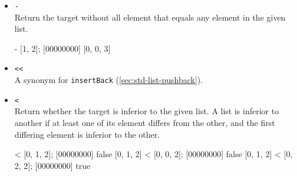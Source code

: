 \begin{itemize}
\item \lstinline|-|\\
Return the target without all element that equals any element in the
given list.

\begin{urbiscript}[firstnumber=last]
[0, 1, 0, 2, 3] - [1, 2];
[00000000] [0, 0, 3]
\end{urbiscript}

\item \lstinline|<<|\\
A synonym for \lstinline|insertBack| (\autoref{sec:std-list-pushback}).

\item \lstinline|<|\\
Return whether the target is inferior to the given list. A list is
inferior to another if at least one of its element differs from the
other, and the first differing element is inferior to the other.

\begin{urbiscript}[firstnumber=last]
[0, 1, 2] < [0, 1, 2];
[00000000] false
[0, 1, 2] < [0, 0, 2];
[00000000] false
[0, 1, 2] < [0, 2, 2];
[00000000] true
\end{urbiscript}

\end{itemize}


